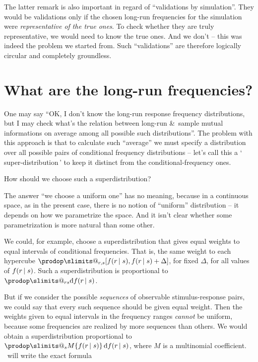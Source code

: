\documentclass[\ifafour a4paper,12pt,\else a5paper,10pt,\fi%
onecolumn,oneside,article,%
british%
]{memoir}
\makeatletter
\newcommand*{\defquote}[1]{`\,#1\,'}
\theoremstyle{remark}
\theoremstyle{innote}
\def\prod{\DOTSI\prodop\slimits@}
\newcommand*{\amp}{\&}
\newcommand*{\di}{\mathrm{d}}%
\DeclarePairedDelimiter\clcl{[}{]}
\renewcommand*{\|}[1][]{\nonscript\,#1\vert\nonscript\;\mathopen{}}
\newcommand*{\puzzle}{{\fontencoding{U}\fontfamily{fontawesometwo}\selectfont\symbol{225}}}
\newcommand{\mynote}[1]{ {\color{notecolour}\puzzle\ #1}}
\makeatother
\begin{document}
The latter remark is also important in regard of \enquote{validations by
  simulation}. They would be validations only if the chosen long-run
frequencies for the simulation were \emph{representative of the true ones}.
To check whether they are truly representative, we would need to know the
true ones. And we don't -- this was indeed the problem we started from.
Such \enquote{validations} are therefore logically circular and completely
groundless.

\section{What are the long-run frequencies?}
\label{sec:longrun_freqs}


One may say \enquote{OK, I don't know the long-run response frequency
  distributions, but I may check what's the relation between long-run \amp\
  sample mutual informations on average among all possible such
  distributions}. The problem with this approach is that to calculate such
\enquote{average} we must specify a distribution over all possible pairs of
conditional frequency distributions -- let's call this a
\defquote{super-distribution} to keep it distinct from the
conditional-frequency ones.

How should we choose such a superdistribution?

The answer \enquote{we choose a uniform one} has no meaning, because in a
continuous space, as in the present case, there is no notion of
\enquote{uniform} distribution -- it depends on how we parametrize the
space. And it isn't clear whether some parametrization is more natural than
some other.

We could, for example, choose a superdistribution that gives equal weights
to equal intervals of conditional frequencies. That is, the same weight to
each hypercube $\prod_{r,s}\clcl{f(r \|s), f(r \|s) + \Delta}$, for fixed
$\Delta$, for all values of $f(r \|s)$. Such a superdistribution is
proportional to $\prod_{rs}\di f(r \|s)$.

But if we consider the possible \emph{sequences} of observable
stimulus-response pairs, we could say that every such sequence should be
given equal weight. Then the weights given to equal intervals in the
frequency ranges \emph{cannot} be uniform, because some frequencies are
realized by more sequences than others. We would obtain a superdistribution
proportional to $\prod_{s} M\{f(r \|s)\}\,\di f(r \|s)$, where $M$ is a
multinomial coefficient. \mynote{will write the exact formula}
\end{document}
